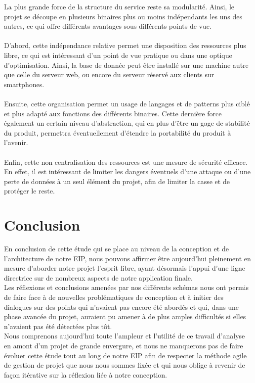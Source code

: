 \documentclass{life-fr}
\begin{document}
La plus grande force de la structure du service reste sa modularité. Ainsi, le projet se découpe en plusieurs binaires plus ou moins indépendants les uns des autres, ce qui offre différents avantages sous différents points de vue.\\
\\
D’abord, cette indépendance relative permet une disposition des ressources plus libre, ce qui est intéressant d’un point de vue pratique ou dans une optique d’optimisation. Ainsi, la base de donnée peut être installé sur une machine autre que celle du serveur web, ou encore du serveur réservé aux clients sur smartphones.\\
\\
Ensuite, cette organisation permet un usage de langages et de patterns plus ciblé et plus adapté aux fonctions des différents binaires. Cette dernière force également un certain niveau d’abstraction, qui en plus d'être un gage de stabilité du produit, permettra éventuellement d'étendre la portabilité du produit à l’avenir.\\
\\
Enfin, cette non centralisation des ressources est une mesure de sécurité efficace. En effet, il est intéressant de limiter les dangers éventuels d’une attaque ou d’une perte de données à un seul élément du projet, afin de limiter la casse et de protéger le reste.


\chapter{Conclusion}

En conclusion de cette étude qui se place au niveau de la conception et de l'architecture de notre
EIP, nous pouvons affirmer être aujourd'hui pleinement en mesure d'aborder notre projet
l'esprit libre, ayant désormais l'appui d'une ligne directrice sur de nombreux
aspects de notre application finale.
\\
Les réflexions et conclusions amenées par nos différents schémas nous ont permis
de faire face à de nouvelles problématiques de conception et à initier des dialogues
sur des points qui n'avaient pas encore été abordés et qui, dans une phase avancée
du projet, auraient pu amener à de plus amples difficultés si elles n'avaient pas été
détectées plus tôt.
\\
Nous comprenons aujourd'hui toute l'ampleur et l'utilité de ce travail d'analyse en amont
d'un projet de grande envergure, et nous ne manquerons pas de faire évoluer cette
étude tout au long de notre EIP afin de respecter la méthode agile de gestion
de projet que nous nous sommes fixée et qui nous oblige à revenir de façon itérative
sur la réflexion liée à notre conception.

\end{document}

